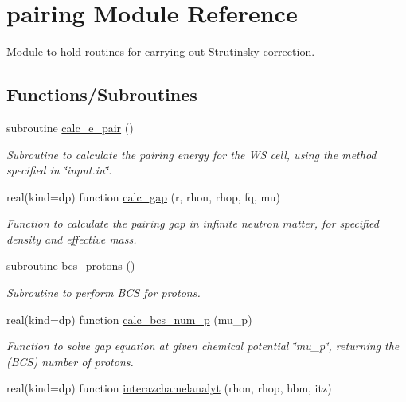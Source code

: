 \hypertarget{namespacepairing}{}\section{pairing Module Reference}
\label{namespacepairing}


Module to hold routines for carrying out Strutinsky correction.  


\subsection*{Functions/\+Subroutines}
\begin{DoxyCompactItemize}
\item 
subroutine \mbox{\hyperlink{namespacepairing_ac34989a934af1e6a63131c619426c5aa}{calc\+\_\+e\+\_\+pair}} ()
\begin{DoxyCompactList}\small\item\em Subroutine to calculate the pairing energy for the WS cell, using the method specified in \char`\"{}input.\+in\char`\"{}. \end{DoxyCompactList}\item 
real(kind=dp) function \mbox{\hyperlink{namespacepairing_abad69eb8cb33077add1b9da84bff7c55}{calc\+\_\+gap}} (r, rhon, rhop, fq, mu)
\begin{DoxyCompactList}\small\item\em Function to calculate the pairing gap in infinite neutron matter, for specified density and effective mass. \end{DoxyCompactList}\item 
subroutine \mbox{\hyperlink{namespacepairing_a693cac2cfa7fcb7ad19984fefe20495c}{bcs\+\_\+protons}} ()
\begin{DoxyCompactList}\small\item\em Subroutine to perform B\+CS for protons. \end{DoxyCompactList}\item 
real(kind=dp) function \mbox{\hyperlink{namespacepairing_a37440fb2ff0d8a3495d051f3f14c9107}{calc\+\_\+bcs\+\_\+num\+\_\+p}} (mu\+\_\+p)
\begin{DoxyCompactList}\small\item\em Function to solve gap equation at given chemical potential \char`\"{}mu\+\_\+p\char`\"{}, returning the (B\+CS) number of protons. \end{DoxyCompactList}\item 
real(kind=dp) function \mbox{\hyperlink{namespacepairing_aebb21947c7228a3fb9a092edfa226662}{interazchamelanalyt}} (rhon, rhop, hbm, itz)

\end{DoxyCompactItemize}
